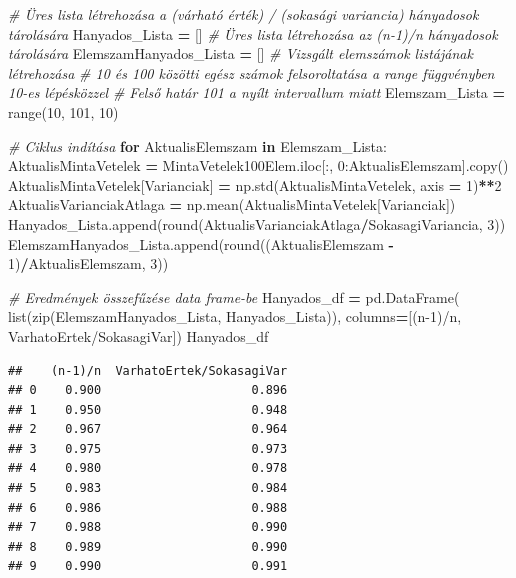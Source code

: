 \documentclass[
]{book}
\newenvironment{Shaded}{\begin{snugshade}}{\end{snugshade}}
\newcommand{\BuiltInTok}[1]{#1}
\newcommand{\CommentTok}[1]{\textcolor[rgb]{0.56,0.35,0.01}{\textit{#1}}}
\newcommand{\ControlFlowTok}[1]{\textcolor[rgb]{0.13,0.29,0.53}{\textbf{#1}}}
\newcommand{\DecValTok}[1]{\textcolor[rgb]{0.00,0.00,0.81}{#1}}
\newcommand{\KeywordTok}[1]{\textcolor[rgb]{0.13,0.29,0.53}{\textbf{#1}}}
\newcommand{\NormalTok}[1]{#1}
\newcommand{\OperatorTok}[1]{\textcolor[rgb]{0.81,0.36,0.00}{\textbf{#1}}}
\newcommand{\StringTok}[1]{\textcolor[rgb]{0.31,0.60,0.02}{#1}}
\begin{document}
\begin{Shaded}
\begin{Highlighting}[]
\CommentTok{\# Üres lista létrehozása a (várható érték) / (sokasági variancia) hányadosok tárolására}
\NormalTok{Hanyados\_Lista }\OperatorTok{=}\NormalTok{ []}
\CommentTok{\# Üres lista létrehozása az (n{-}1)/n hányadosok tárolására}
\NormalTok{ElemszamHanyados\_Lista }\OperatorTok{=}\NormalTok{ []}
\CommentTok{\# Vizsgált elemszámok listájának létrehozása}
\CommentTok{\# 10 és 100 közötti egész számok felsoroltatása a \textquotesingle{}range\textquotesingle{} függvényben 10{-}es lépésközzel}
\CommentTok{\# Felső határ 101 a nyílt intervallum miatt}
\NormalTok{Elemszam\_Lista }\OperatorTok{=} \BuiltInTok{range}\NormalTok{(}\DecValTok{10}\NormalTok{, }\DecValTok{101}\NormalTok{, }\DecValTok{10}\NormalTok{)}

\CommentTok{\# Ciklus indítása}
\ControlFlowTok{for}\NormalTok{ AktualisElemszam }\KeywordTok{in}\NormalTok{ Elemszam\_Lista:}
\NormalTok{  AktualisMintaVetelek }\OperatorTok{=}\NormalTok{ MintaVetelek100Elem.iloc[:, }\DecValTok{0}\NormalTok{:AktualisElemszam].copy()}
\NormalTok{  AktualisMintaVetelek[}\StringTok{\textquotesingle{}Varianciak\textquotesingle{}}\NormalTok{] }\OperatorTok{=}\NormalTok{ np.std(AktualisMintaVetelek, axis }\OperatorTok{=} \DecValTok{1}\NormalTok{)}\OperatorTok{**}\DecValTok{2}
\NormalTok{  AktualisVarianciakAtlaga }\OperatorTok{=}\NormalTok{ np.mean(AktualisMintaVetelek[}\StringTok{\textquotesingle{}Varianciak\textquotesingle{}}\NormalTok{])}
\NormalTok{  Hanyados\_Lista.append(}\BuiltInTok{round}\NormalTok{(AktualisVarianciakAtlaga}\OperatorTok{/}\NormalTok{SokasagiVariancia, }\DecValTok{3}\NormalTok{))}
\NormalTok{  ElemszamHanyados\_Lista.append(}\BuiltInTok{round}\NormalTok{((AktualisElemszam }\OperatorTok{{-}} \DecValTok{1}\NormalTok{)}\OperatorTok{/}\NormalTok{AktualisElemszam, }\DecValTok{3}\NormalTok{))}

\CommentTok{\# Eredmények összefűzése data frame{-}be }
\NormalTok{Hanyados\_df }\OperatorTok{=}\NormalTok{ pd.DataFrame(}
  \BuiltInTok{list}\NormalTok{(}\BuiltInTok{zip}\NormalTok{(ElemszamHanyados\_Lista, Hanyados\_Lista)),}
\NormalTok{  columns}\OperatorTok{=}\NormalTok{[}\StringTok{\textquotesingle{}(n{-}1)/n\textquotesingle{}}\NormalTok{, }\StringTok{\textquotesingle{}VarhatoErtek/SokasagiVar\textquotesingle{}}\NormalTok{])}
\NormalTok{Hanyados\_df}
\end{Highlighting}
\end{Shaded}

\begin{verbatim}
##    (n-1)/n  VarhatoErtek/SokasagiVar
## 0    0.900                     0.896
## 1    0.950                     0.948
## 2    0.967                     0.964
## 3    0.975                     0.973
## 4    0.980                     0.978
## 5    0.983                     0.984
## 6    0.986                     0.988
## 7    0.988                     0.990
## 8    0.989                     0.990
## 9    0.990                     0.991
\end{verbatim}
\end{document}
